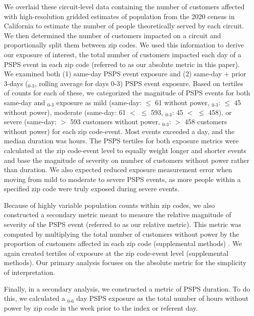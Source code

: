 \documentclass[../main.tex]{subfiles}
\begin{document}
We overlaid these circuit-level data containing the number of customers affected\citep{PSEHealthyEnergy_PSPS, cpuc_psps_2025} with high-resolution gridded estimates of population from the 2020 census in California\citep{depsky2022high} to estimate the number of people theoretically served by each circuit.  We then determined the number of customers impacted on a circuit and proportionally split them between zip codes. We used this information to derive our exposure of interest, the total number of customers impacted each day of a PSPS event in each zip code (referred to as our absolute metric in this paper). We examined both (1) same-day PSPS event exposure and (2) same-day + prior 3-days ($_{0\text{-}3}$, rolling average for days 0-3) PSPS event exposure. Based on tertiles of counts for each of these, we categorized the magnitude of PSPS events for both same-day and $_{0\text{-}3}$ exposure as mild (same-day: $\leq$ 61 without power, $_{0\text{-}3}$: $\leq$ 45 without power), moderate (same-day: 61 $<$  $\leq$ 593, $_{0\text{-}3}$: 45 $<$  $\leq$ 458), or severe (same-day: $>$ 593 customers without power, $_{0\text{-}3}$: $>$ 458 customers without power) for each zip code-event. Most events exceeded a day, and the median duration was \medianduration{} hours. The PSPS tertiles for both exposure metrics were calculated at the zip code-event level to equally weight longer and shorter events and base the magnitude of severity on number of customers without power rather than duration. We also expected reduced exposure measurement error when moving from mild to moderate to severe PSPS events, as more people within a specified zip code were truly exposed during severe events. 

Because of highly variable population counts within zip codes, we also constructed a secondary metric meant to measure the relative magnitude of severity of the PSPS event (referred to as our relative metric). This metric was computed by multiplying the total number of customers without power by the proportion of customers affected in each zip code (supplemental methods) . We again created tertiles of exposure at the zip code-event level (supplemental methods). Our primary analysis focuses on the absolute metric for the simplicity of interpretation. 

Finally, in a secondary analysis, we constructed a metric of PSPS duration. To do this, we calculated a $_{0\text{-}6}$ day PSPS exposure as the total number of hours without power by zip code in the week prior to the index or referent day.
\end{document}
